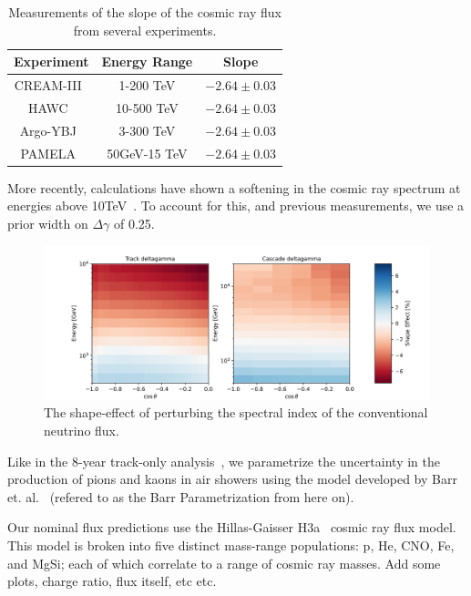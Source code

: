 \documentclass[main.tex]{subfiles}
\begin{document}
\begin{table}
    \centering
    \begin{tabular}{|c | cc|}\hline
        Experiment & Energy Range & Slope \\\hline
        CREAM-III~\cite{Yoon_2017} & 1-200 TeV & $-2.64\pm 0.03$ \\
        HAWC~\cite{PhysRevD.96.122001} & 10-500 TeV & $-2.64\pm 0.03$ \\
        Argo-YBJ~\cite{IACOVACCI2013157} & 3-300 TeV & $-2.64\pm 0.03$ \\
        PAMELA~\cite{astra-7-235-2011} & 50GeV-15 TeV & $-2.64\pm 0.03$ \\\hline
    \end{tabular}
    \caption{Measurements of the slope of the cosmic ray flux from several experiments.}\label{tab:spectral}
\end{table}

More recently, calculations have shown a softening in the cosmic ray spectrum at energies above 10TeV~\cite{LIPARI2020102441}. 
To account for this, and previous measurements, we use a prior width on $\Delta \gamma$ of 0.25. 

\begin{figure}
    \centering
    \includegraphics[width=0.8\linewidth]{figures/systematics/deltagamma.png}
    \caption{The shape-effect of perturbing the spectral index of the conventional neutrino flux.}
\end{figure}


Like in the 8-year track-only analysis~\cite{Aartsen_2020,Aartsen_2020_prd}, we parametrize the uncertainty in the production of pions and kaons in air showers using the model developed by Barr et. al.~\cite{PhysRevD.74.094009} (refered to as the Barr Parametrization from here on). 

Our nominal flux predictions use the Hillas-Gaisser H3a~\cite{GAISSER2012801} cosmic ray flux model. 
This model is broken into five distinct mass-range populations: p, He, CNO, Fe, and MgSi; each of which correlate to a range of cosmic ray masses. 
Add some plots, charge ratio, flux itself, etc etc.
\end{document}
